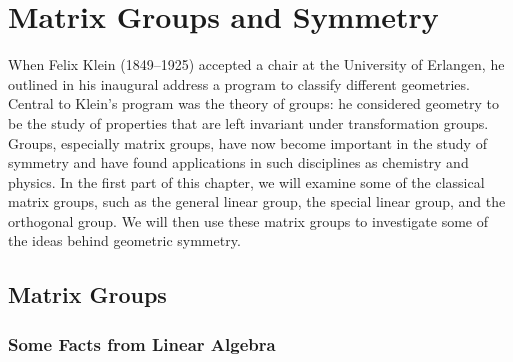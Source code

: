 \chapter{Matrix Groups and Symmetry}
 
 
 
When Felix Klein (1849--1925) accepted a chair at
the University of Erlangen, he outlined in his inaugural address a
program to classify different geometries. Central to Klein's
program was the theory of groups: he considered geometry to be the
study of properties that are left invariant under transformation
groups. Groups, especially matrix groups, have now become important in
the study of symmetry and have found applications in such disciplines
as chemistry and physics. In the first part of this chapter, we will
examine some of the classical matrix groups, such as the general linear
group, the special linear group, and the orthogonal group. We will
then use these matrix groups to investigate some of the ideas behind
geometric symmetry.  
 
 
 
\section{Matrix Groups}
 
 
 
\subsection*{Some Facts from Linear Algebra}
 
 
 

